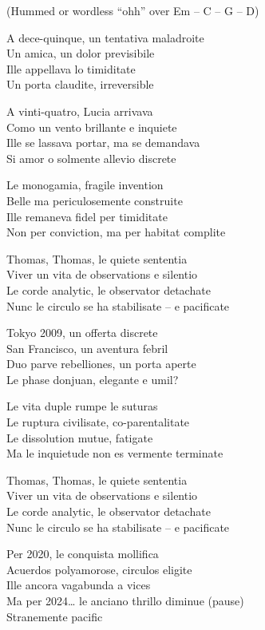 \begin{lyrics}
(Hummed or wordless “ohh” over Em – C – G – D)

A dece-quinque, un tentativa maladroite\\
Un amica, un dolor previsibile\\
Ille appellava lo timiditate\\
Un porta claudite, irreversible

A vinti-quatro, Lucia arrivava\\
Como un vento brillante e inquiete\\
Ille se lassava portar, ma se demandava\\
Si amor o solmente allevio discrete

Le monogamia, fragile invention\\
Belle ma periculosemente construite\\
Ille remaneva fidel per timiditate\\
Non per conviction, ma per habitat complite

Thomas, Thomas, le quiete sententia\\
Viver un vita de observations e silentio\\
Le corde analytic, le observator detachate\\
Nunc le circulo se ha stabilisate – e pacificate

Tokyo 2009, un offerta discrete\\
San Francisco, un aventura febril\\
Duo parve rebelliones, un porta aperte\\
Le phase donjuan, elegante e umil?

Le vita duple rumpe le suturas\\
Le ruptura civilisate, co-parentalitate\\
Le dissolution mutue, fatigate\\
Ma le inquietude non es vermente terminate

Thomas, Thomas, le quiete sententia\\
Viver un vita de observations e silentio\\
Le corde analytic, le observator detachate\\
Nunc le circulo se ha stabilisate – e pacificate

Per 2020, le conquista mollifica\\
Acuerdos polyamorose, circulos eligite\\
Ille ancora vagabunda a vices\\
Ma per 2024… le anciano thrillo diminue
(pause)\\
Stranemente pacific


\end{lyrics}
